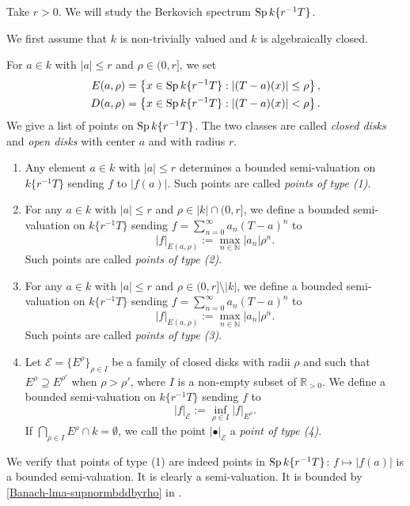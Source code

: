 \begin{example}\label{ex-Berkovichdisk}
    Take $r>0$. We will study the Berkovich spectrum $\operatorname{Sp} k\{r^{-1}T\}$. 

    We first assume that $k$ is non-trivially valued and $k$ is algebraically closed.

    For $a\in k$ with $|a|\leq r$ and $\rho\in (0,r]$, we set
    \[
        \begin{aligned}
        E(a,\rho)=\left\{ x\in \operatorname{Sp} k\{r^{-1}T\}: |(T-a)(x)|\leq \rho \right\} ,\\
        D(a,\rho)=\left\{ x\in \operatorname{Sp} k\{r^{-1}T\}: |(T-a)(x)|< \rho \right\}.
        \end{aligned} 
    \]
    We give a list of points on $\operatorname{Sp} k\{r^{-1}T\}$. The two classes are called \emph{closed disks}  and \emph{open disks} with center $a$ and with radius $r$.

    \begin{enumerate}
        \item Any element $a\in k$ with $|a|\leq r$ determines a bounded semi-valuation on $k\{r^{-1}T\}$ sending $f$ to $|f(a)|$. Such points are called \emph{points of type (1)}.
        \item For any $a\in k$ with $|a|\leq r$ and $\rho\in |k|\cap (0,r]$, we define a bounded semi-valuation  on $k\{r^{-1}T\}$ sending $f=\sum_{n=0}^{\infty}a_n (T-a)^n$ to 
        \[
            |f|_{E(a,\rho)}:=\max_{n\in \mathbb{N}} |a_n|\rho^n.
        \]
        Such points are called \emph{points of type (2)}.
        \item For any $a\in k$ with $|a|\leq r$ and $\rho\in (0,r]\setminus |k|$, we define a bounded semi-valuation  on $k\{r^{-1}T\}$ sending $f=\sum_{n=0}^{\infty}a_n (T-a)^n$ to 
        \[
            |f|_{E(a,\rho)}:=\max_{n\in \mathbb{N}} |a_n|\rho^n.
        \]
        Such points are called \emph{points of type (3)}.
        \item Let $\mathcal{E}=\{E^{\rho}\}_{\rho\in I}$ be a family of closed disks with radii $\rho$ and such that $E^{\rho}\supseteq E^{\rho'}$ when $\rho>\rho'$, where $I$ is a non-empty subset of $\mathbb{R}_{>0}$. We define a bounded semi-valuation  on $k\{r^{-1}T\}$ sending $f$ to 
        \[
            |f|_{\mathcal{E}}:=\inf_{\rho\in I} |f|_{E^{\rho}}.
        \]
        If $\bigcap_{\rho\in I}E^{\rho}\cap k=\emptyset$, we call the point $|\bullet|_{\mathcal{E}}$ a \emph{point of type (4)}. 
    \end{enumerate}

    We verify that points of type (1) are indeed points in $\operatorname{Sp} k\{r^{-1}T\}$: $f\mapsto |f(a)|$ is a bounded semi-valuation. It is clearly a semi-valuation.
    It is bounded by \cref{Banach-lma-supnormbddbyrho} in .



\end{example}
